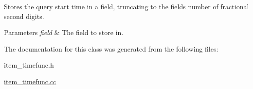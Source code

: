 Stores the query start time in a field, truncating to the field\textquotesingle{}s number of fractional second digits.


\begin{DoxyParams}{Parameters}
{\em field} & The field to store in. \\
\hline
\end{DoxyParams}


The documentation for this class was generated from the following files\+:\begin{DoxyCompactItemize}
\item 
item\+\_\+timefunc.\+h\item 
\mbox{\hyperlink{item__timefunc_8cc}{item\+\_\+timefunc.\+cc}}\end{DoxyCompactItemize}
